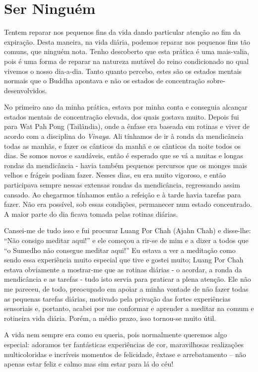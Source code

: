 \chapter{Ser Ninguém}

Tentem  reparar nos pequenos fins da vida dando particular atenção ao
fim da expiração. Desta maneira, na vida diária, podemos reparar nos
pequenos fins tão comuns, que ninguém nota. Tenho descoberto que esta
prática é uma mais-valia, pois é uma forma de reparar na natureza
mutável do reino condicionado no qual vivemos o nosso dia-a-dia. Tanto
quanto percebo, estes são os estados mentais normais que o Buddha
apontava e não os estados de concentração sobre-desenvolvidos.

No primeiro ano da minha prática, estava por minha conta e conseguia
alcançar estados mentais de concentração elevada, dos quais gostava
muito. Depois fui para Wat Pah Pong (Tailândia), onde a ênfase era
baseada em rotinas e viver de acordo com a disciplina do \emph{Vinaya}.
Ali tínhamos de ir à ronda da mendicância todas as manhãs, e fazer os
cânticos da manhã e os cânticos da noite todos os dias. Se somos novos e
saudáveis, então é esperado que se vá a muitas e longas rondas da
mendicância - havia também pequenos percursos que os monges mais velhos
e frágeis podiam fazer. Nesses dias, eu era muito vigoroso, e então
participava sempre nessas extensas rondas da mendicância, regressando
assim cansado. Ao chegarmos tínhamos então a refeição e à tarde havia
tarefas para fazer. Não era possível, sob essas condições, permanecer
num estado concentrado. A maior parte do dia ficava tomada pelas rotinas
diárias.

Cansei-me de tudo isso e fui procurar Luang Por Chah (Ajahn Chah) e
disse-lhe: ``Não consigo meditar aqui!'' e ele começou a rir-se de mim e
a dizer a todos que ``o Sumedho não consegue meditar aqui!'' Eu estava a
ver a meditação como sendo essa experiência muito especial que tive e
gostei muito; Luang Por Chah estava obviamente a mostrar-me que as
rotinas diárias - o acordar, a ronda da mendicância e as tarefas - tudo
isto servia para praticar a plena atenção. Ele não me pareceu, de todo,
preocupado em apoiar a minha vontade de não fazer todas as pequenas
tarefas diárias, motivado pela privação das fortes experiências
sensoriais e, portanto, acabei por me conformar e aprender a meditar na
comum e rotineira vida diária. Porém, a médio prazo, isso tornou-se
muito útil.

A vida nem sempre era como eu queria, pois normalmente queremos algo
especial: adoramos ter fantásticas experiências de cor, maravilhosas
realizações multicoloridas e incríveis momentos de felicidade, êxtase e
arrebatamento -- não apenas estar feliz e calmo mas sim estar para lá do
céu!

